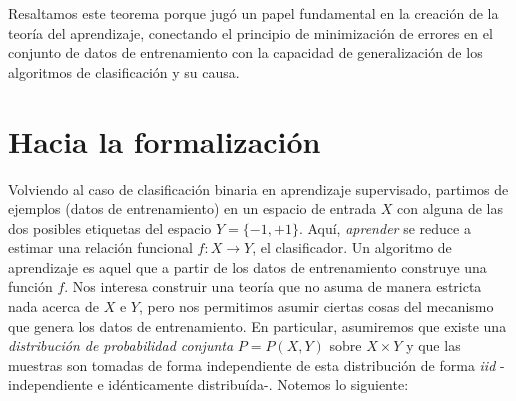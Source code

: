 \documentclass{article}
\begin{document}
Resaltamos este teorema porque jugó un papel fundamental en la creación de la teoría del aprendizaje, conectando el
principio de minimización de errores en el conjunto de datos de entrenamiento con la capacidad de generalización
de los algoritmos de clasificación y su causa.

\section{Hacia la formalización}

Volviendo al caso de clasificación binaria en aprendizaje supervisado, partimos de ejemplos (datos de entrenamiento) 
en un espacio de entrada $X$ con alguna de las dos posibles etiquetas del espacio $Y=\{-1,+1\}$. Aquí, \textit{aprender}
se reduce a estimar una relación funcional $f:X\rightarrow Y$, el clasificador. Un algoritmo de aprendizaje es aquel
que a partir de los datos de entrenamiento construye una función $f$. Nos interesa construir una teoría que no asuma
de manera estricta nada acerca de $X$ e $Y$, pero nos permitimos asumir ciertas cosas del mecanismo que genera los
datos de entrenamiento. En particular, asumiremos que existe una \textit{distribución de probabilidad conjunta} $P=P(X,Y)$
sobre $X\times Y$ y que las muestras son tomadas de forma independiente de esta distribución de forma \textit{iid} -independiente
e idénticamente distribuída-. Notemos lo siguiente:
\end{document}
